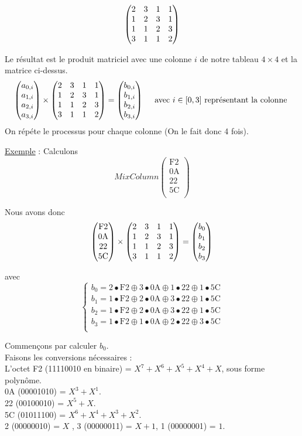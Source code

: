 $$ \begin{pmatrix} 2 & 3 & 1 & 1 \\ 1 & 2 & 3 & 1 \\ 1 & 1 & 2 & 3 \\ 3 & 1 & 1 & 2 \\ \end{pmatrix} $$

Le résultat est le produit matriciel avec une colonne $i$ de notre tableau $4 \times 4$ et la matrice ci-dessus.
$$ \begin{pmatrix} a_{0,i} \\ a_{1,i} \\ a_{2,i} \\ a_{3,i} \end{pmatrix} \times \begin{pmatrix} 2 & 3 & 1 & 1 \\ 1 & 2 & 3 & 1 \\ 1 & 1 & 2 & 3 \\ 3 & 1 & 1 & 2 \\ \end{pmatrix} = \begin{pmatrix} b_{0,i} \\ b_{1,i} \\ b_{2,i} \\ b_{3,i} \end{pmatrix} \quad \text{ avec } i \in [0,3] \text { représentant la colonne }$$
On répéte le processus pour chaque colonne (On le fait donc 4 fois).

\def\exemple{
\begin{pmatrix}
    \text{F2} \\ 
    \text{0A} \\ 
    \text{22} \\ 
    \text{5C} \\ 
\end{pmatrix} 
}

\noindent \underline{Exemple} : Calculons
$$ MixColumn\exemple$$

Nous avons donc 
$$ \exemple \times \MixColumn = 
\begin{pmatrix}
    b_0 \\ b_1 \\ b_2 \\ b_3
\end{pmatrix} $$

avec $$ \begin{cases}
     {\displaystyle b_{0}=2\bullet \text{F2}\oplus 3\bullet \text{0A}\oplus 1\bullet \text{22}\oplus 1\bullet\text{5C}} \\
{\displaystyle b_{1}=1\bullet \text{F2}\oplus 2\bullet \text{0A}\oplus 3\bullet \text{22}\oplus 1\bullet \text{5C}} \\
{\displaystyle b_{2}=1\bullet \text{F2}\oplus 2\bullet \text{0A}\oplus 3\bullet \text{22}\oplus 1\bullet \text{5C}}\\
{\displaystyle b_{3}=1\bullet \text{F2}\oplus 1\bullet \text{0A}\oplus 2\bullet \text{22}\oplus 3\bullet \text{5C}}\\
   \end{cases}
$$

Commençons par calculer $b_0$.\\

\noindent Faisons les conversions nécessaires : \\
L'octet F2 (11110010 en binaire) = $X^7 + X^6 + X^5 + X^4 +X$, sous forme polynôme. \\
0A (00001010) = $X^3 + X^1$. \\
22 (00100010) = $X^5 + X$. \\
5C (01011100) = $X^6 + X^4 +X^3 + X^2 $. \\
2 (00000010) = $X$ , 3 (00000011) = $X + 1$, 1 (00000001) = $1$. \\

